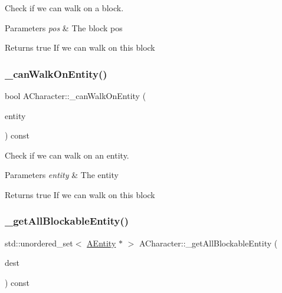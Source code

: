 Check if we can walk on a block. 


\begin{DoxyParams}{Parameters}
{\em pos} & The block pos \\
\hline
\end{DoxyParams}
\begin{DoxyReturn}{Returns}
true If we can walk on this block 
\end{DoxyReturn}
\mbox{\label{class_a_character_afce84f8aaaedb3f889f0d52e5f592ea8}} 
\subsubsection{\texorpdfstring{\+\_\+can\+Walk\+On\+Entity()}{\_canWalkOnEntity()}}
{\footnotesize\ttfamily bool A\+Character\+::\+\_\+can\+Walk\+On\+Entity (\begin{DoxyParamCaption}\item[{\hyperlink{class_a_entity}{A\+Entity} $\ast$}]{entity }\end{DoxyParamCaption}) const\hspace{0.3cm}{\ttfamily [protected]}}



Check if we can walk on an entity. 


\begin{DoxyParams}{Parameters}
{\em entity} & The entity \\
\hline
\end{DoxyParams}
\begin{DoxyReturn}{Returns}
true If we can walk on this block 
\end{DoxyReturn}
\mbox{\label{class_a_character_aef50edb318dc54c0fcccf053df180099}} 
\subsubsection{\texorpdfstring{\+\_\+get\+All\+Blockable\+Entity()}{\_getAllBlockableEntity()}}
{\footnotesize\ttfamily std\+::unordered\+\_\+set$<$ \hyperlink{class_a_entity}{A\+Entity} $\ast$ $>$ A\+Character\+::\+\_\+get\+All\+Blockable\+Entity (\begin{DoxyParamCaption}\item[{glm\+::vec3}]{dest }\end{DoxyParamCaption}) const\hspace{0.3cm}{\ttfamily [protected]}}



